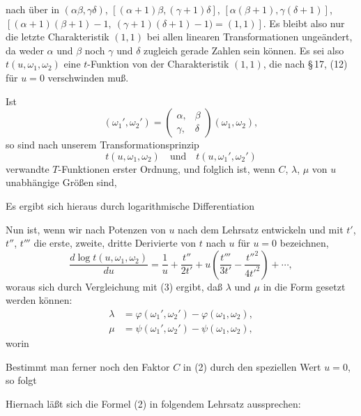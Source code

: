 nach über in $(\alpha\beta, \gamma\delta)$, $[(\alpha+1)\beta, (\gamma+1)\delta]$, $[\alpha(\beta+1), \gamma(\delta+1)]$, $[(\alpha+1)(\beta+1)-1,\ (\gamma+1)(\delta+1)-1)=(1,1)]$.
Es bleibt also nur die letzte Charakteristik $(1,1)$ bei allen linearen Transformationen ungeändert, da weder $\alpha$ und $\beta$ noch $\gamma$ und $\delta$ zugleich gerade Zahlen sein können. Es sei also $t(u, \omega_1, \omega_2)$ eine $t$-Funktion von der Charakteristik $(1,1)$, die nach \S\,17, (12) für $u = 0$ verschwinden muß.

Ist
\[
(\omega_1', \omega_2') = \begin{pmatrix} \alpha, & \beta \\ \gamma, & \delta \end{pmatrix} (\omega_1, \omega_2),
\]
so sind nach unserem Transformationsprinzip
\[
t(u, \omega_1, \omega_2) \quad \text{und} \quad t(u, \omega_1', \omega_2')
\]
verwandte $T$-Funktionen erster Ordnung, und folglich ist, wenn $C$, $\lambda$, $\mu$ von $u$ unabhängige Größen sind,

Es ergibt sich hieraus durch logarithmische Differentiation

Nun ist, wenn wir nach Potenzen von $u$ nach dem  Lehrsatz entwickeln und mit $t'$, $t''$, $t'''$ die erste, zweite, dritte Derivierte von $t$ nach $u$ für $u = 0$ bezeichnen,
\[
\frac{d\log t(u,\omega_1,\omega_2)}{du} = \frac{1}{u} + \frac{t''}{2t'} + u\left(\frac{t'''}{3t'} - \frac{t''^2}{4t'^2}\right) + \cdots,
\]
woraus sich durch Vergleichung mit (3) ergibt, daß $\lambda$ und $\mu$ in die Form gesetzt werden können:
\[
\begin{aligned}
\lambda &= \varphi(\omega_1',\omega_2') - \varphi(\omega_1,\omega_2),\\
\mu &= \psi(\omega_1',\omega_2') - \psi(\omega_1,\omega_2),
\end{aligned}
\]
worin

Bestimmt man ferner noch den Faktor $C$ in (2) durch den speziellen Wert $u = 0$, so folgt

Hiernach läßt sich die Formel (2) in folgendem Lehrsatz aussprechen:


